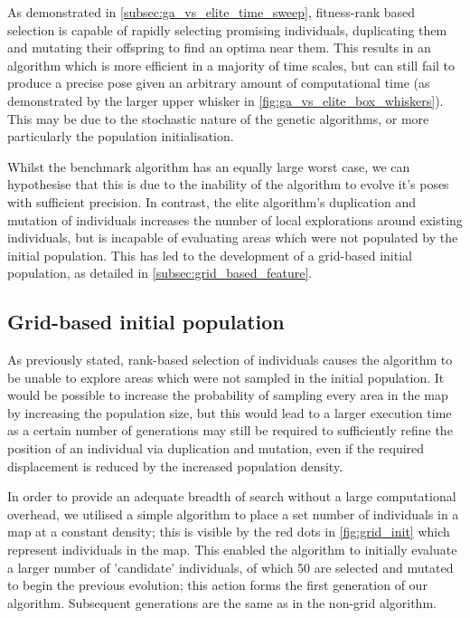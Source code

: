 \documentclass[authoryearcitations]{UoYCSproject}
\begin{document}
As demonstrated in \autoref{subsec:ga_vs_elite_time_sweep}, fitness-rank based selection is capable of rapidly selecting promising individuals, duplicating them and mutating their offspring to find an optima near them. This results in an algorithm which is more efficient in a majority of time scales, but can still fail to produce a precise pose given an arbitrary amount of computational time (as demonstrated by the larger upper whisker in \autoref{fig:ga_vs_elite_box_whiskers}). This may be due to the stochastic nature of the genetic algorithms, or more particularly the population initialisation. 

Whilst the benchmark algorithm has an equally large worst case, we can hypothesise that this is due to the inability of the algorithm to evolve it's poses with sufficient precision. In contrast, the elite algorithm's duplication and mutation of individuals increases the number of local explorations around existing individuals, but is incapable of evaluating areas which were not populated by the initial population. This has led to the development of a grid-based initial population, as detailed in \autoref{subsec:grid_based_feature}.

\subsection{Grid-based initial population}
\label{subsec:grid_based_feature}
 As previously stated, rank-based selection of individuals causes the algorithm to be unable to explore areas which were not sampled in the initial population. It would be possible to increase the probability of sampling every area in the map by increasing the population size, but this would lead to a larger execution time as a certain number of generations may still be required to sufficiently refine the position of an individual via duplication and mutation, even if the required displacement is reduced by the increased population density.

 In order to provide an adequate breadth of search without a large computational overhead, we utilised a simple algorithm to place a set number of individuals in a map at a constant density; this is visible by the red dots in \autoref{fig:grid_init} which represent individuals in the map. This enabled the algorithm to initially evaluate a larger number of 'candidate' individuals, of which 50 are selected and mutated to begin the previous evolution; this action forms the first generation of our algorithm. Subsequent generations are the same as in the non-grid algorithm. 
\end{document}
